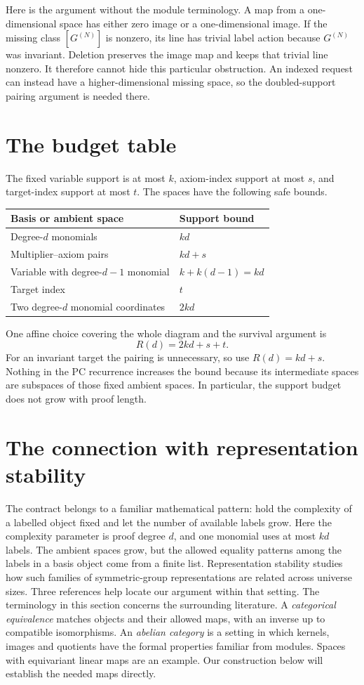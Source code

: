 Here is the argument without the module terminology. A map from a
one-dimensional space has either zero image or a one-dimensional
image. If the missing class $[G^{(N)}]$ is nonzero, its line has trivial
label action because $G^{(N)}$ was invariant. Deletion preserves the
image map and keeps that trivial line nonzero. It therefore cannot
hide this particular obstruction. An indexed request can instead
have a higher-dimensional missing space, so the doubled-support
pairing argument is needed there.

\section{The budget table}
The fixed variable support is at most $k$, axiom-index support at most
$s$, and target-index support at most $t$. The spaces have the following
safe bounds.
\begin{center}
\begin{tabular}{@{}ll@{}}
\toprule
Basis or ambient space & Support bound\\
\midrule
Degree-$d$ monomials & $kd$\\
Multiplier--axiom pairs & $kd+s$\\
Variable with degree-$d-1$ monomial & $k+k(d-1)=kd$\\
Target index & $t$\\
Two degree-$d$ monomial coordinates & $2kd$\\
\bottomrule
\end{tabular}
\end{center}
One affine choice covering the whole diagram and the survival argument is
\[
                           R(d)=2kd+s+t.
\]
For an invariant target the pairing is unnecessary, so use $R(d)=kd+s$.
Nothing in the PC recurrence increases the bound because its intermediate
spaces are subspaces of those fixed ambient spaces. In particular, the
support budget does not grow with proof length.

\section{The connection with representation stability}\label{tx:sec:stability-context}
The contract belongs to a familiar mathematical pattern: hold the
complexity of a labelled object fixed and let the number of available
labels grow. Here the complexity parameter is proof degree $d$, and
one monomial uses at most $kd$ labels. The ambient spaces grow, but
the allowed equality patterns among the labels in a basis object
come from a finite list. Representation stability studies how such
families of symmetric-group representations are related across universe sizes.
Three references help locate our argument within that setting.
The terminology in this section concerns the surrounding literature.
A \emph{categorical equivalence} matches objects and their allowed
maps, with an inverse up to compatible isomorphisms. An
\emph{abelian category} is a setting in which kernels, images and
quotients have the formal properties familiar from modules.
Spaces with equivariant linear maps are an example. Our construction
below will establish the needed maps directly.

